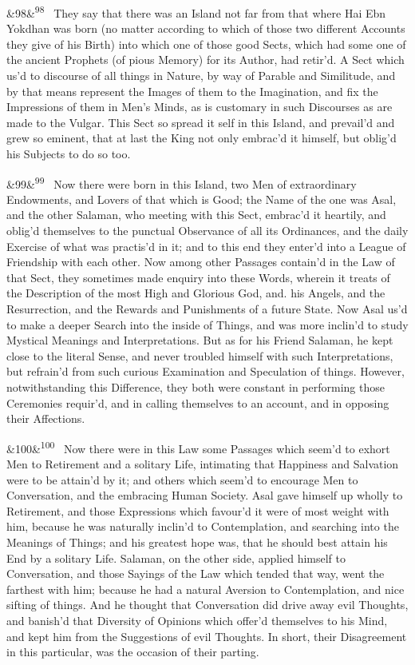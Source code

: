 \documentclass[12pt]{article}
\newcommand{\para}[1][]{\par\noindent\ifx&#1&\else\textsuperscript{\footnotesize #1}~\fi}
\begin{document}
\para[98] They say that there was an Island not far from that where Hai Ebn Yokdhan was born (no matter according to which of those two different Accounts they give of his Birth) into which one of those good Sects, which had some one of the ancient Prophets (of pious Memory) for its Author, had retir'd. A Sect which us'd to discourse of all things in Nature, by way of Parable and Similitude, and by that means represent the Images of them to the Imagination, and fix the Impressions of them in Men's Minds, as is customary in such Discourses as are made to the Vulgar. This Sect so spread it self in this Island, and prevail'd and grew so eminent, that at last the King not only embrac'd it himself, but oblig'd his Subjects to do so too.

\para[99] Now there were born in this Island, two Men of extraordinary Endowments, and Lovers of that which is Good; the Name of the one was Asal, and the other Salaman, who meeting with this Sect, embrac'd it heartily, and oblig'd themselves to the punctual Observance of all its Ordinances, and the daily Exercise of what was practis'd in it; and to this end they enter'd into a League of Friendship with each other. Now among other Passages contain'd in the Law of that Sect, they sometimes made enquiry into these Words, wherein it treats of the Description of the most High and Glorious God, and. his Angels, and the Resurrection, and the Rewards and Punishments of a future State. Now Asal us'd to make a deeper Search into the inside of Things, and was more inclin'd to study Mystical Meanings and Interpretations. But as for his Friend Salaman, he kept close to the literal Sense, and never troubled himself with such Interpretations, but refrain'd from such curious Examination and Speculation of things. However, notwithstanding this Difference, they both were constant in performing those Ceremonies requir'd, and in calling themselves to an account, and in opposing their Affections.

\para[100] Now there were in this Law some Passages which seem'd to exhort Men to Retirement and a solitary Life, intimating that Happiness and Salvation were to be attain'd by it; and others which seem'd to encourage Men to Conversation, and the embracing Human Society. Asal gave himself up wholly to Retirement, and those Expressions which favour'd it were of most weight with him, because he was naturally inclin'd to Contemplation, and searching into the Meanings of Things; and his greatest hope was, that he should best attain his End by a solitary Life. Salaman, on the other side, applied himself to Conversation, and those Sayings of the Law which tended that way, went the farthest with him; because he had a natural Aversion to Contemplation, and nice sifting of things. And he thought that Conversation did drive away evil Thoughts, and banish'd that Diversity of Opinions which offer'd themselves to his Mind, and kept him from the Suggestions of evil Thoughts. In short, their Disagreement in this particular, was the occasion of their parting.
\end{document}
